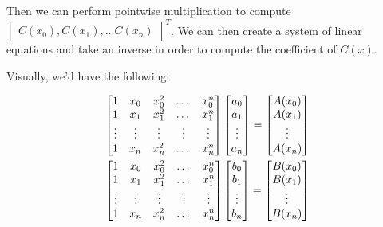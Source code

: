 \begin{enumerate}
{Then we can perform pointwise multiplication to compute $\begin{bmatrix} C(x_{0}), C(x_{1}), \dots C(x_{n})\end{bmatrix}^{T}$. We can then create a system of linear equations and take an inverse in order to compute the coefficient of $C(x)$.

Visually, we'd have the following:

\begin{align*}
  \begin{bmatrix}
    1 & x_{0} & x_{0}^{2} & \dots & x_{0}^{n} \\
    1 & x_{1} & x_{1}^{2} & \dots & x_{1}^{n} \\
    \vdots & \vdots & \vdots & \vdots & \vdots \\
    1 & x_{n} & x_{n}^{2} & \dots & x_{n}^{n}
  \end{bmatrix}
  \begin{bmatrix}
    a_{0} \\
    a_{1} \\
    \vdots \\
    a_{n}
  \end{bmatrix}
  = \begin{bmatrix}
    A(x_{0}) \\
    A(x_{1}) \\
    \vdots \\
    A(x_{n})
  \end{bmatrix} \\
  \begin{bmatrix}
    1 & x_{0} & x_{0}^{2} & \dots & x_{0}^{n} \\
    1 & x_{1} & x_{1}^{2} & \dots & x_{1}^{n} \\
    \vdots & \vdots & \vdots & \vdots & \vdots \\
    1 & x_{n} & x_{n}^{2} & \dots & x_{n}^{n}
  \end{bmatrix}
  \vspace{2mm}
  \begin{bmatrix}
    b_{0} \\
    b_{1} \\
    \vdots \\
    b_{n}
  \end{bmatrix}
  = \begin{bmatrix}
    B(x_{0}) \\
    B(x_{1}) \\
    \vdots \\
    B(x_{n})
  \end{bmatrix} \\

\end{align*}}
\end{enumerate}
